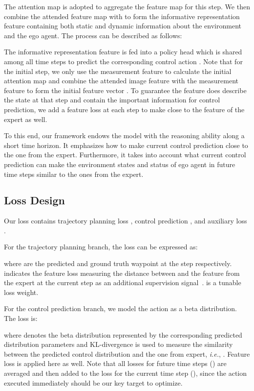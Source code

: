 \documentclass{article}
\begin{document}
The attention map  is adopted to aggregate the feature map  for this step.
We then combine the attended feature map with  to form the informative representation feature  containing both static and dynamic information about the environment and the ego agent. The process can be described as follows:

The informative representation feature  is fed into a policy head which is shared among all time steps to predict the corresponding control action . 
Note that for the initial step, we only use the measurement feature to calculate the initial attention map and combine the attended image feature with the measurement feature to form the initial feature vector . To guarantee the feature  does describe the state at that step and contain the important information for control prediction, we add a feature loss at each step to make  close to the feature of the expert as well. 

To this end, our \algname framework endows the model with the reasoning ability along a short time horizon. It emphasizes how to make current control prediction close to the one from the expert. Furthermore, it takes into account what current control prediction can make the environment states and status of ego agent in future time steps similar to the ones from the expert.


\subsection{Loss Design} \label{sec:loss}
Our loss contains trajectory planning loss , control prediction , and auxiliary loss .

For the trajectory planning branch, the loss  can be expressed as:

where  are the predicted and ground truth waypoint at the  step respectively.
 indicates the feature loss measuring the  distance between  and the feature  from the expert at the current step as an additional supervision signal~\citep{zhang2021roach}.  is a tunable loss weight.

For the control prediction branch, we model the action as a beta distribution. The loss  is:

where  denotes the beta distribution represented by the corresponding  predicted distribution parameters and KL-divergence is used to measure the similarity between the predicted control distribution and the one from expert, \textit{i.e.}, . Feature loss is applied here as well. 
Note that all losses for future time steps () are averaged and then added to the loss for the current time step (), since the action executed immediately should be our key target to optimize.
\end{document}
